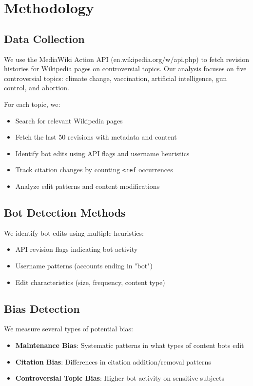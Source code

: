 \documentclass[11pt]{article}
\begin{document}
\section{Methodology}

\subsection{Data Collection}
We use the MediaWiki Action API (en.wikipedia.org/w/api.php) to fetch revision histories for Wikipedia pages on controversial topics. Our analysis focuses on five controversial topics: climate change, vaccination, artificial intelligence, gun control, and abortion.

For each topic, we:
\begin{itemize}
\item Search for relevant Wikipedia pages
\item Fetch the last 50 revisions with metadata and content
\item Identify bot edits using API flags and username heuristics
\item Track citation changes by counting \texttt{<ref} occurrences
\item Analyze edit patterns and content modifications
\end{itemize}

\subsection{Bot Detection Methods}
We identify bot edits using multiple heuristics:
\begin{itemize}
\item API revision flags indicating bot activity
\item Username patterns (accounts ending in "bot")
\item Edit characteristics (size, frequency, content type)
\end{itemize}

\subsection{Bias Detection}
We measure several types of potential bias:
\begin{itemize}
\item \textbf{Maintenance Bias}: Systematic patterns in what types of content bots edit
\item \textbf{Citation Bias}: Differences in citation addition/removal patterns
\item \textbf{Controversial Topic Bias}: Higher bot activity on sensitive subjects
\end{itemize}
\end{document}
